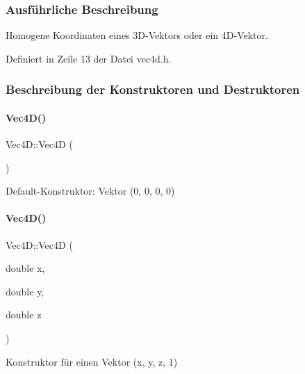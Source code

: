 \subsubsection{Ausführliche Beschreibung}
Homogene Koordinaten eines 3\+D-\/\+Vektors oder ein 4\+D-\/\+Vektor. 

Definiert in Zeile 13 der Datei vec4d.\+h.



\subsubsection{Beschreibung der Konstruktoren und Destruktoren}
\mbox{\label{classVec4D_afef8dcc77fa1c7791adcc7f5624fb52a}} 
\paragraph{\texorpdfstring{Vec4\+D()}{Vec4D()}\hspace{0.1cm}{\footnotesize\ttfamily [1/4]}}
{\footnotesize\ttfamily Vec4\+D\+::\+Vec4D (\begin{DoxyParamCaption}{ }\end{DoxyParamCaption})}



Default-\/\+Konstruktor\+: Vektor (0, 0, 0, 0) 

\mbox{\label{classVec4D_ab8662f7cf26c846e19009afb03b81424}} 
\paragraph{\texorpdfstring{Vec4\+D()}{Vec4D()}\hspace{0.1cm}{\footnotesize\ttfamily [2/4]}}
{\footnotesize\ttfamily Vec4\+D\+::\+Vec4D (\begin{DoxyParamCaption}\item[{double}]{x,  }\item[{double}]{y,  }\item[{double}]{z }\end{DoxyParamCaption})}



Konstruktor für einen Vektor ({\ttfamily x}, {\ttfamily y}, {\ttfamily z}, 1) 

\mbox{\label{classVec4D_abfc701094837431b1d995f600cfb8c6d}} 

